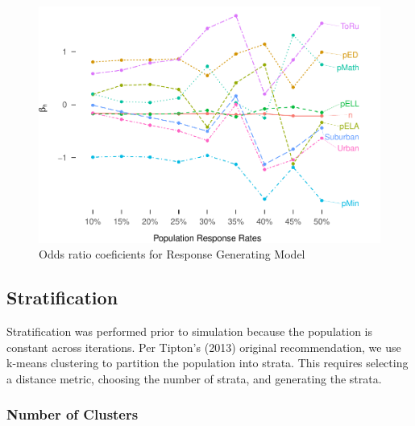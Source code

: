 \documentclass[man,floatsintext]{apa6}
\theoremstyle{definition}
\theoremstyle{definition}
\theoremstyle{definition}
\theoremstyle{remark}
\begin{document}
\begin{figure}
\centering
\includegraphics{GenSamp_Paper_files/figure-latex/fig-RGM-Pars-1.pdf}
\caption{\label{fig:fig-RGM-Pars}Odds ratio coeficients for Response
Generating Model}
\end{figure}

\hypertarget{stratification}{%
\subsection{Stratification}\label{stratification}}

Stratification was performed prior to simulation because the population
is constant across iterations. Per Tipton's (2013) original
recommendation, we use k-means clustering to partition the population
into strata. This requires selecting a distance metric, choosing the
number of strata, and generating the strata.

\hypertarget{number-of-clusters}{%
\subsubsection{Number of Clusters}\label{number-of-clusters}}
\end{document}
